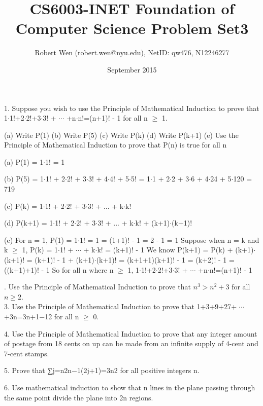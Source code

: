 \documentclass{article}
\title{CS6003-INET Foundation of Computer Science Problem Set3}
\author{Robert Wen (robert.wen@nyu.edu), NetID: qw476, N12246277}
\date{September 2015}
\begin{document}
\begin{large}

\maketitle


1. Suppose you wish to use the Principle of Mathematical Induction to prove that
1$\cdot$1!+2$\cdot$2!+3$\cdot$3! + $\cdots$ +n$\cdot$n!=(n+1)! - 1 for all n $\ge$ 1.

(a) Write P(1) (b) Write P(5) (c) Write P(k) (d) Write P(k+1) (e) Use the Principle of Mathematical Induction to prove that P(n) is true for all n

(a) P(1) = 1$\cdot$1! = 1

(b) P(5) = 1$\cdot$1! + 2$\cdot$2! + 3$\cdot$3! + 4$\cdot$4! + 5$\cdot$5!
         = 1$\cdot$1  + 2$\cdot$2  + 3$\cdot$6  + 4$\cdot$24 + 5$\cdot$120
         = 719

(c) P(k) = 1$\cdot$1! + 2$\cdot$2! + 3$\cdot$3! + ... + k$\cdot$k!

(d) P(k+1) = 1$\cdot$1! + 2$\cdot$2! + 3$\cdot$3! + ... + k$\cdot$k! + (k+1)$\cdot$(k+1)!

(e) For n = 1, P(1) = 1$\cdot$1! = 1 = (1+1)! - 1 = 2 - 1 = 1
\indent    Suppose when n = k and k $\ge$ 1, P(k) = 1$\cdot$1! + $\cdots$ + k$\cdot$k! = (k+1)! - 1
\indent    We know P(k+1) = P(k) + (k+1)$\cdot$(k+1)! 
\indent \indent           = (k+1)! - 1 + (k+1)$\cdot$(k+1)!
\indent \indent           = (k+1+1)(k+1)! - 1
\indent \indent           = (k+2)! - 1
\indent \indent           = ((k+1)+1)! - 1
\indent    So for all n where n $\ge$ 1, 1$\cdot$1!+2$\cdot$2!+3$\cdot$3! + $\cdots$ +n$\cdot$n!=(n+1)! - 1

. Use the Principle of Mathematical Induction to prove that $n^{3}>n^{2}+3$ for all $n\ge 2$. \\

3. Use the Principle of Mathematical Induction to prove that 1+3+9+27+ $\cdots$ +3n=3n+1−12 for all n $\ge$ 0.

4. Use the Principle of Mathematical Induction to prove that any integer amount of postage from 18 cents on up can be made from an infinite supply of 4-cent and 7-cent stamps.

5. Prove that ∑j=n2n−1(2j+1)=3n2 for all positive integers n. 

6. Use mathematical induction to show that n lines in the plane passing through the same point divide the plane into 2n regions.


\end{large}
\end{document}
